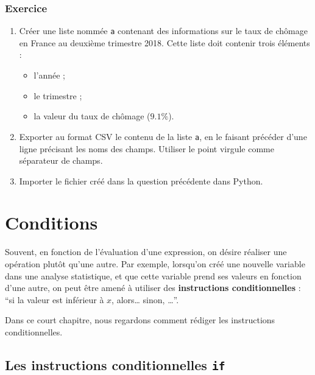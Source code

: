 \documentclass[12pt,]{book}
\providecommand{\tightlist}{%
  \setlength{\itemsep}{0pt}\setlength{\parskip}{0pt}}
\numberwithin{equation}{section}
\numberwithin{countremarque}{section}
\let\BeginKnitrBlock\begin \let\EndKnitrBlock\end
\begin{document}
\subsection{Exercice}\label{exercice-3}

\BeginKnitrBlock{exframe}
\begin{enumerate}
\def\labelenumi{\arabic{enumi}.}
\tightlist
\item
  Créer une liste nommée \texttt{a} contenant des informations sur le
  taux de chômage en France au deuxième trimestre 2018. Cette liste doit
  contenir trois éléments :

  \begin{itemize}
  \tightlist
  \item
    l'année ;
  \item
    le trimestre ;
  \item
    la valeur du taux de chômage (\(9.1\%\)).
  \end{itemize}
\item
  Exporter au format CSV le contenu de la liste \texttt{a}, en le
  faisant précéder d'une ligne précisant les noms des champs. Utiliser
  le point virgule comme séparateur de champs.
\item
  Importer le fichier créé dans la question précédente dans Python.
\end{enumerate}
\EndKnitrBlock{exframe}

\chapter{Conditions}\label{conditions}

Souvent, en fonction de l'évaluation d'une expression, on désire
réaliser une opération plutôt qu'une autre. Par exemple, lorsqu'on créé
une nouvelle variable dans une analyse statistique, et que cette
variable prend ses valeurs en fonction d'une autre, on peut être amené à
utiliser des \textbf{instructions conditionnelles} : ``si la valeur est
inférieur à \(x\), alors\ldots{} sinon, \ldots{}''.

Dans ce court chapitre, nous regardons comment rédiger les instructions
conditionnelles.

\section{\texorpdfstring{Les instructions conditionnelles
\texttt{if}}{Les instructions conditionnelles if}}\label{les-instructions-conditionnelles-if}
\end{document}
